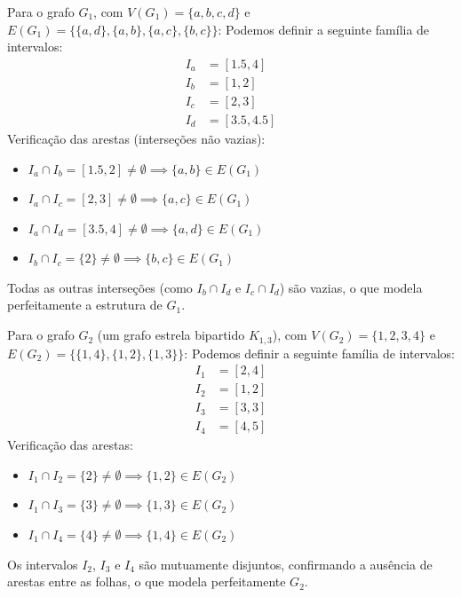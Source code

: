 \begin{enumerate}[label=\textbf{\arabic*.}, ref=\arabic*]
\begin{enumerate}
        Para o grafo $G_1$, com $V(G_1) = \{a,b,c,d\}$ e $E(G_1) = \{\{a,d\}, \{a,b\} , \{a,c\}, \{b,c\}\}$:
        Podemos definir a seguinte família de intervalos:
        \begin{align*}
            I_a &= [1.5, 4] \\
            I_b &= [1, 2] \\
            I_c &= [2, 3] \\
            I_d &= [3.5, 4.5]
        \end{align*}
        Verificação das arestas (interseções não vazias):
        \begin{itemize}
            \item $I_a \cap I_b = [1.5, 2] \neq \emptyset \implies \{a,b\} \in E(G_1)$
            \item $I_a \cap I_c = [2, 3] \neq \emptyset \implies \{a,c\} \in E(G_1)$
            \item $I_a \cap I_d = [3.5, 4] \neq \emptyset \implies \{a,d\} \in E(G_1)$
            \item $I_b \cap I_c = \{2\} \neq \emptyset \implies \{b,c\} \in E(G_1)$
        \end{itemize}
        Todas as outras interseções (como $I_b \cap I_d$ e $I_c \cap I_d$) são vazias, o que modela perfeitamente a estrutura de $G_1$.
        
        Para o grafo $G_2$ (um grafo estrela bipartido $K_{1,3}$), com $V(G_2) = \{1,2,3,4\}$ e $E(G_2) = \{\{1,4\}, \{1,2\}, \{1,3\}\}$:
        Podemos definir a seguinte família de intervalos:
        \begin{align*}
            I_1 &= [2, 4] \\
            I_2 &= [1, 2] \\
            I_3 &= [3, 3] \\
            I_4 &= [4, 5]
        \end{align*}
        Verificação das arestas:
        \begin{itemize}
            \item $I_1 \cap I_2 = \{2\} \neq \emptyset \implies \{1,2\} \in E(G_2)$
            \item $I_1 \cap I_3 = \{3\} \neq \emptyset \implies \{1,3\} \in E(G_2)$
            \item $I_1 \cap I_4 = \{4\} \neq \emptyset \implies \{1,4\} \in E(G_2)$
        \end{itemize}
        Os intervalos $I_2$, $I_3$ e $I_4$ são mutuamente disjuntos, confirmando a ausência de arestas entre as folhas, o que modela perfeitamente $G_2$.
        

\end{enumerate}
\end{enumerate}
